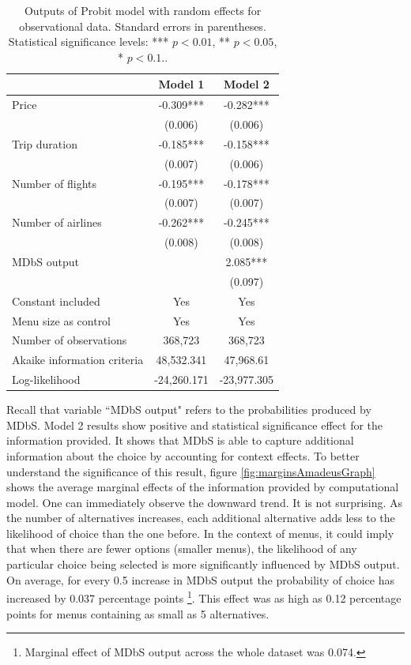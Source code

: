 \documentclass[a4paper,12pt]{article}
\begin{document}
\begin{table}
    \centering

    \begin{tabular}{lcc}
    \hline
     & Model 1 & Model 2 \\
    \hline
    Price & -0.309*** & -0.282*** \\
     & (0.006) & (0.006) \\[1ex]
    Trip duration & -0.185*** & -0.158*** \\
     & (0.007) & (0.006) \\[1ex]
    Number of flights & -0.195*** & -0.178*** \\
     & (0.007) & (0.007) \\[1ex]
    Number of airlines & -0.262*** & -0.245*** \\
     & (0.008) & (0.008) \\[1ex]
    MDbS output & & 2.085*** \\
     & & (0.097) \\[1ex]
    Constant included & Yes & Yes \\[1ex]
    Menu size as control & Yes & Yes \\[1ex]
    Number of observations & 368,723 & 368,723 \\[1ex]
    Akaike information criteria & 48,532.341 & 47,968.61 \\[1ex]
    Log-likelihood & -24,260.171 & -23,977.305 \\[1ex]
    \hline
    \end{tabular}
    \caption{Outputs of Probit model with random effects for observational data. Standard errors in parentheses. Statistical significance levels: *** $p<0.01$, ** $p<0.05$, * $p<0.1.$.}
    \label{tab:amadeusProbitResults}
\end{table}

Recall that variable ``MDbS output" refers to the probabilities produced by MDbS. Model 2 results show positive and statistical significance effect for the information provided. It shows that MDbS is able to capture additional information about the choice by accounting for context effects. To better understand the significance of this result, figure \ref{fig:marginsAmadeusGraph} shows the average marginal effects of the information provided by computational model. One can immediately observe the downward trend. It is not surprising. As the number of alternatives increases, each additional alternative adds less to the likelihood of choice than the one before. In the context of menus, it could imply that when there are fewer options (smaller menus), the likelihood of any particular choice being selected is more significantly influenced by MDbS output. On average, for every 0.5 increase in MDbS output the probability of choice has increased by 0.037 percentage points \footnote{Marginal effect of MDbS output across the whole dataset was 0.074.}. This effect was as high as 0.12 percentage points for menus containing as small as 5 alternatives. 
\end{document}
